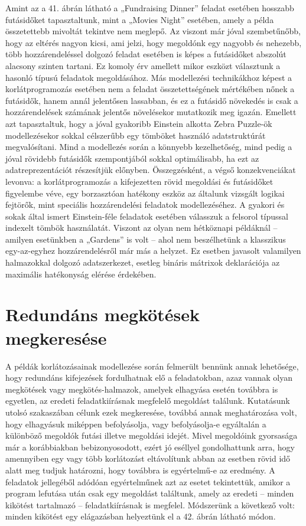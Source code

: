 \documentclass[12pt,a4paper,twoside, openright]{report}
\begin{document}
			Amint az a 41. ábrán látható a „Fundraising Dinner” feladat esetében hosszabb futásidőket tapasztaltunk, mint a „Movies Night” esetében, amely a példa összetettebb mivoltát tekintve nem meglepő. Az viszont már jóval szembetűnőbb, hogy az eltérés nagyon kicsi, ami jelzi, hogy megoldónk egy nagyobb és nehezebb, több hozzárendeléssel dolgozó feladat esetében is képes a futásidőket abszolút alacsony szinten tartani. Ez komoly érv amellett mikor eszközt választunk a hasonló típusú feladatok megoldásához. Más modellezési technikákhoz képest a korlátprogramozás esetében nem a feladat összetettségének mértékében nőnek a futásidők, hanem annál jelentősen lassabban, és ez a futásidő növekedés is csak a hozzárendelések számának jelentős növelésekor mutatkozik meg igazán. 
			Emellett azt tapasztaltuk, hogy a jóval gyakoribb Einstein alkotta Zebra Puzzle-ök modellezésekor sokkal célszerűbb egy tömböket használó adatstruktúrát megvalósítani. Mind a modellezés során a könnyebb kezelhetőség, mind pedig a jóval rövidebb futásidők szempontjából sokkal optimálisabb, ha ezt az adatreprezentációt részesítjük előnyben.
			Összegzésként, a végső konzekvenciákat levonva: a korlátprogramozás a kifejezetten rövid megoldási és futásidőket figyelembe véve, egy borzasztóan hatékony eszköz az általunk vizsgált logikai fejtörők, mint speciális hozzárendelési feladatok modellezéséhez. A gyakori és sokak által ismert Einstein-féle feladatok esetében válasszuk a felsorol típussal indexelt tömbök használatát. Viszont az olyan nem hétköznapi példáknál – amilyen esetünkben a „Gardens” is volt – ahol nem beszélhetünk a klasszikus egy-az-egyhez hozzárendelésről már más a helyzet. Ez esetben javasolt valamilyen halmazokkal dolgozó adatszerkezet, esetleg bináris mátrixok deklarációja az maximális hatékonyság elérése érdekében.
	
	\chapter{Redundáns megkötések megkeresése}
		A példák korlátozásainak modellezése során felmerült bennünk annak lehetősége, hogy redundáns kifejezések fordulhatnak elő a feladatokban, azaz vannak olyan megkötések vagy megkötés-halmazok, amelyek elhagyása esetén továbbra is egyetlen, az eredeti feladatkiírásnak megfelelő megoldást találunk. Kutatásunk utolsó szakaszában célunk ezek megkeresése, továbbá annak meghatározása volt, hogy elhagyásuk miképpen befolyásolja, vagy befolyásolja-e egyáltalán a különböző megoldók futási illetve megoldási idejét.
		Mivel megoldóink gyorsasága már a korábbiakban bebizonyosodott, ezért jó eséllyel gondolhattunk arra, hogy amennyiben egy vagy több korlátozást eltávolítunk abban az esetben rövid idő alatt meg tudjuk határozni, hogy továbbra is egyértelmű-e az eredmény. A feladatok jellegéből adódóan egyértelműnek azt az esetet tekintettük, amikor a program lefutása után csak egy megoldást találtunk, amely az eredeti – minden kikötést tartalmazó – feladatkiírásnak is megfelel. Módszerünk a következő volt: minden kikötést egy elágazásban helyeztünk el a 42. ábrán látható módon.
		
\end{document}
